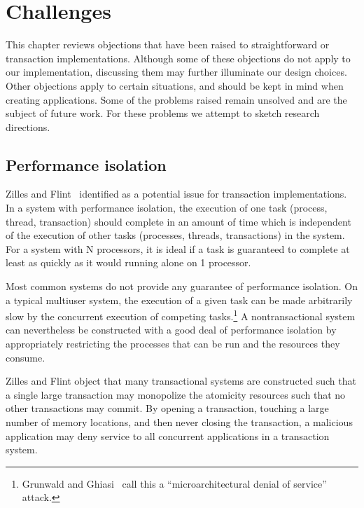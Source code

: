 \chapter{Challenges}\label{cha:chall}

This chapter reviews objections that have been raised to
straightforward or \naive transaction implementations.
Although some of these objections do not apply to our implementation,
discussing them may further illuminate our design choices.
Other objections apply to certain situations, and should be kept in mind when
creating applications.  Some of the problems raised remain unsolved
and are the subject of future work.  For these problems we
attempt to sketch research directions.

\section{Performance isolation}
Zilles and Flint~\cite{ZillesFl05} identified
 as a potential issue for
transaction implementations.  In a system with performance isolation,
the execution of one task (process, thread, transaction) should
complete in an amount of time which is independent of the execution of
other tasks (processes, threads, transactions) in the system.  For
a system with N processors, it is ideal if a task is guaranteed to
complete at least as quickly as it would running alone on 1
processor.

Most common systems do not provide any guarantee of
performance isolation.  On a typical multiuser system, the execution
of a given task can be made arbitrarily slow by the concurrent
execution of competing tasks.\footnote{Grunwald and
  Ghiasi~\cite{GrunwaldGh02} call this a ``microarchitectural denial
  of service'' attack.}
A nontransactional system can nevertheless
be constructed with a good deal of performance isolation by
appropriately restricting the processes that can be run and the
resources they consume.

Zilles and Flint object that many transactional systems are
constructed such that a single large transaction may monopolize the
atomicity resources such that no other transactions may commit.  By
opening a transaction, touching a large number of memory locations,
and then never closing the transaction, a malicious application may
deny service to all concurrent applications in a transaction system.

